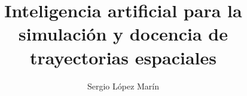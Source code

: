 
\title{Inteligencia artificial para la simulación y docencia de trayectorias espaciales}
\author{Sergio López Marín}










\address{UCLM --- Escuela de Ingeniería Industrial y Aeroespacial\\
    Campus Universitario de la Real Fábrica de Armas}
